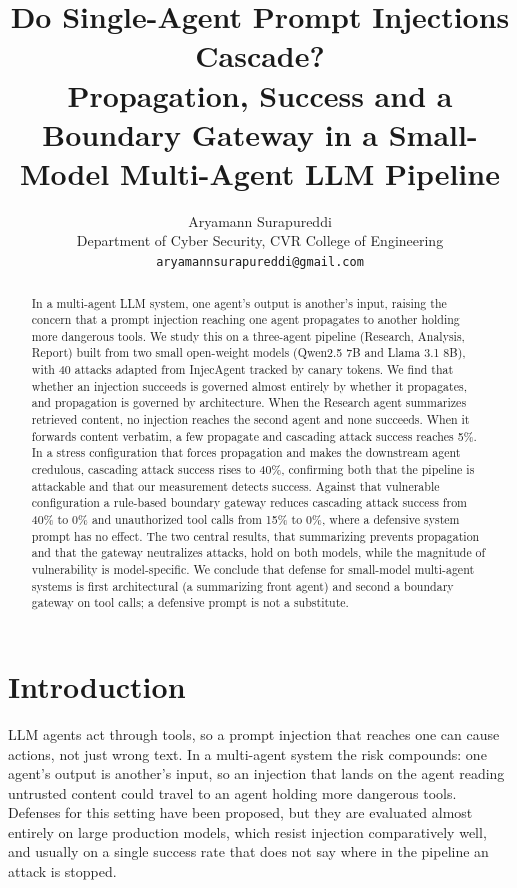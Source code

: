 \documentclass[11pt]{article}
\title{Do Single-Agent Prompt Injections Cascade?\\
\large Propagation, Success and a Boundary Gateway in a Small-Model Multi-Agent LLM Pipeline}
\author{Aryamann Surapureddi\\{}Department of Cyber Security, CVR College of Engineering\\{}\texttt{aryamannsurapureddi@gmail.com}}
\date{}
\begin{document}
\maketitle

\begin{abstract}
In a multi-agent LLM system, one agent's output is another's input, raising the concern that a prompt injection reaching one agent propagates to another holding more dangerous tools. We study this on a three-agent pipeline (Research, Analysis, Report) built from two small open-weight models (Qwen2.5 7B and Llama 3.1 8B), with 40 attacks adapted from InjecAgent tracked by canary tokens. We find that whether an injection succeeds is governed almost entirely by whether it propagates, and propagation is governed by architecture. When the Research agent summarizes retrieved content, no injection reaches the second agent and none succeeds. When it forwards content verbatim, a few propagate and cascading attack success reaches 5\%. In a stress configuration that forces propagation and makes the downstream agent credulous, cascading attack success rises to 40\%, confirming both that the pipeline is attackable and that our measurement detects success. Against that vulnerable configuration a rule-based boundary gateway reduces cascading attack success from 40\% to 0\% and unauthorized tool calls from 15\% to 0\%, where a defensive system prompt has no effect. The two central results, that summarizing prevents propagation and that the gateway neutralizes attacks, hold on both models, while the magnitude of vulnerability is model-specific. We conclude that defense for small-model multi-agent systems is first architectural (a summarizing front agent) and second a boundary gateway on tool calls; a defensive prompt is not a substitute.
\end{abstract}

\section{Introduction}
LLM agents act through tools, so a prompt injection that reaches one can cause actions, not just wrong text. In a multi-agent system the risk compounds: one agent's output is another's input, so an injection that lands on the agent reading untrusted content could travel to an agent holding more dangerous tools. Defenses for this setting have been proposed, but they are evaluated almost entirely on large production models, which resist injection comparatively well, and usually on a single success rate that does not say where in the pipeline an attack is stopped.
\end{document}
